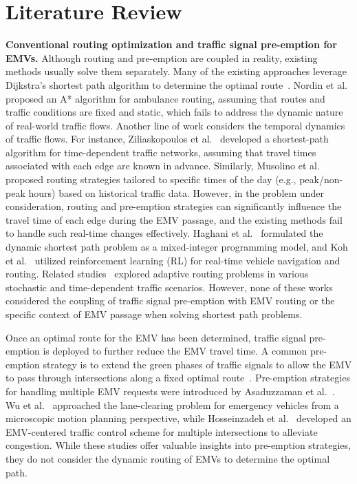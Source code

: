 \section{Literature Review}\label{sec_related_work}

\textbf{Conventional routing optimization and traffic signal pre-emption for EMVs.}
Although routing and pre-emption are coupled in reality, existing methods usually solve them separately. Many of the existing approaches leverage Dijkstra's shortest path algorithm to determine the optimal route~\cite{wang2013development, Mu2018Route, kwon2003route, JOTSHI20091}. Nordin et al.~\cite{nordin2012finding} proposed an A* algorithm for ambulance routing, assuming that routes and traffic conditions are fixed and static, which fails to address the dynamic nature of real-world traffic flows. Another line of work considers the temporal dynamics of traffic flows. For instance, Ziliaskopoulos et al.~\cite{ziliaskopoulos1993time} developed a shortest-path algorithm for time-dependent traffic networks, assuming that travel times associated with each edge are known in advance. Similarly, Musolino et al.~\cite{musolino2013travel} proposed routing strategies tailored to specific times of the day (e.g., peak/non-peak hours) based on historical traffic data. However, in the problem under consideration, routing and pre-emption strategies can significantly influence the travel time of each edge during the EMV passage, and the existing methods fail to handle such real-time changes effectively. Haghani et al.~\cite{haghani2003optimization} formulated the dynamic shortest path problem as a mixed-integer programming model, and Koh et al.~\cite{koh2020real} utilized reinforcement learning (RL) for real-time vehicle navigation and routing. Related studies~\cite{miller2000least, gao2006optimal, kim2005optimal, fan2005shortest, yang2014constraint, huang2012optimal, gao2012real, samaranayake2012tractable, nie2012optimal, thomas2007dynamic} explored adaptive routing problems in various stochastic and time-dependent traffic scenarios. However, none of these works considered the coupling of traffic signal pre-emption with EMV routing or the specific context of EMV passage when solving shortest path problems.

Once an optimal route for the EMV has been determined, traffic signal pre-emption is deployed to further reduce the EMV travel time. A common pre-emption strategy is to extend the green phases of traffic signals to allow the EMV to pass through intersections along a fixed optimal route~\cite{wang2013development, bieker2019modelling}. Pre-emption strategies for handling multiple EMV requests were introduced by Asaduzzaman et al.~\cite{Asaduzzaman2017APriority}. Wu et al.~\cite{wu2020emergency} approached the lane-clearing problem for emergency vehicles from a microscopic motion planning perspective, while Hosseinzadeh et al.~\cite{hosseinzadeh2022mpc} developed an EMV-centered traffic control scheme for multiple intersections to alleviate congestion. While these studies offer valuable insights into pre-emption strategies, they do not consider the dynamic routing of EMVs to determine the optimal path.

